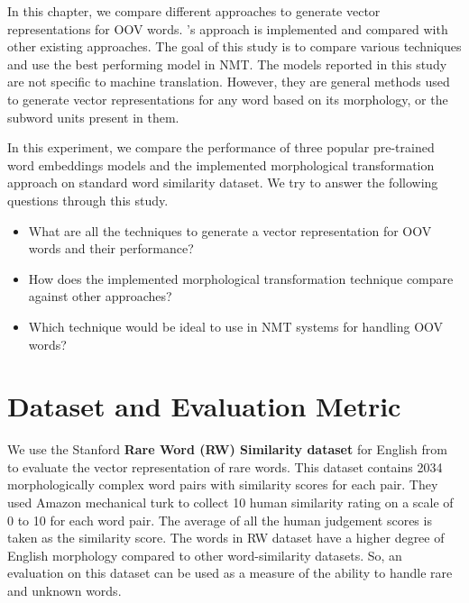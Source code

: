 In this chapter, we compare different approaches to generate vector representations for OOV words. \citeauthor{soricut2015unsupervised}'s approach is implemented and compared with other existing approaches. The goal of this study is to compare various techniques and use the best performing model in NMT. The models reported in this study are not specific to machine translation. However, they are general methods used to generate vector representations for any word based on its morphology, or the subword units present in them. 

In this experiment, we compare the performance of three popular pre-trained word embeddings models \citep{mikolov2013distributed,pennington2014glove,bojanowski2016enriching} and the implemented morphological transformation approach on standard word similarity dataset. We try to answer the following questions through this study.

\begin{itemize}
	\item What are all the techniques to generate a vector representation for OOV words and their performance? 
	\item How does the implemented morphological transformation technique compare against other approaches?
	\item Which technique would be ideal to use in NMT systems for handling OOV words?

\end{itemize}



\section{Dataset and Evaluation Metric}

We use the Stanford \textbf{Rare Word (RW) Similarity dataset}  for English from \cite{luong2013better} to evaluate the vector representation of rare words. This dataset contains 2034 morphologically complex word pairs with similarity scores for each pair. They used Amazon mechanical turk to collect 10 human similarity rating on a scale of 0 to 10 for each word pair. The average of all the human judgement scores is taken as the similarity score. The words in RW dataset have a higher degree of English morphology compared to other word-similarity datasets. So, an evaluation on this dataset can be used as a measure of the ability to handle rare and unknown words.

